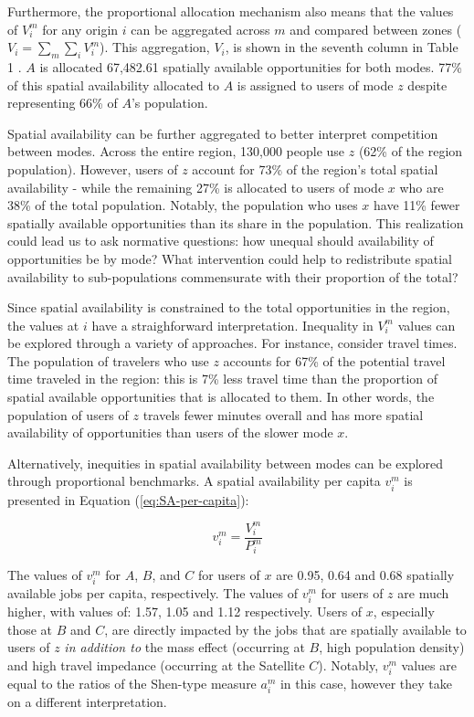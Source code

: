 \documentclass[10pt,letterpaper]{article}
\begin{document}
Furthermore, the proportional allocation mechanism also means that the
values of \(V_i^m\) for any origin \(i\) can be aggregated across \(m\)
and compared between zones (\(V_i = \sum_m{\sum_i{V_i^m}}\)). This
aggregation, \(V_i\), is shown in the seventh column in Table 1 . \(A\)
is allocated 67,482.61 spatially available opportunities for both modes.
77\% of this spatial availability allocated to \(A\) is assigned to
users of mode \(z\) despite representing 66\% of \(A\)'s population.

Spatial availability can be further aggregated to better interpret
competition between modes. Across the entire region, 130,000 people use
\(z\) (62\% of the region population). However, users of \(z\) account
for 73\% of the region's total spatial availability - while the
remaining 27\% is allocated to users of mode \(x\) who are 38\% of the
total population. Notably, the population who uses \(x\) have 11\% fewer
spatially available opportunities than its share in the population. This
realization could lead us to ask normative questions: how unequal should
availability of opportunities be by mode? What intervention could help
to redistribute spatial availability to sub-populations commensurate
with their proportion of the total?

Since spatial availability is constrained to the total opportunities in
the region, the values at \(i\) have a straighforward interpretation.
Inequality in \(V_i^m\) values can be explored through a variety of
approaches. For instance, consider travel times. The population of
travelers who use \(z\) accounts for 67\% of the potential travel time
traveled in the region: this is 7\% less travel time than the proportion
of spatial available opportunities that is allocated to them. In other
words, the population of users of \(z\) travels fewer minutes overall
and has more spatial availability of opportunities than users of the
slower mode \(x\).

Alternatively, inequities in spatial availability between modes can be
explored through proportional benchmarks. A spatial availability per
capita \(v_i^m\) is presented in Equation (\ref{eq:SA-per-capita}):

\begin{equation}
\label{eq:SA-per-capita}
v_{i}^m = \frac{V_{i}^m}{P_{i}^m}
\end{equation}

The values of \(v_i^m\) for \(A\), \(B\), and \(C\) for users of \(x\)
are 0.95, 0.64 and 0.68 spatially available jobs per capita,
respectively. The values of \(v_i^m\) for users of \(z\) are much
higher, with values of: 1.57, 1.05 and 1.12 respectively. Users of
\(x\), especially those at \(B\) and \(C\), are directly impacted by the
jobs that are spatially available to users of \(z\) \emph{in addition
to} the mass effect (occurring at \(B\), high population density) and
high travel impedance (occurring at the Satellite \(C\)). Notably,
\(v_i^m\) values are equal to the ratios of the Shen-type measure
\(a_i^m\) in this case, however they take on a different interpretation.
\end{document}
